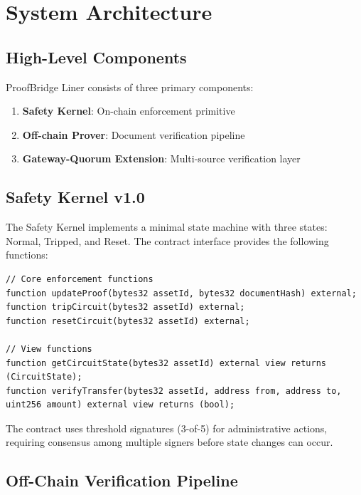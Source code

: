 \documentclass[10pt,conference]{IEEEtran}
\begin{document}
\section{System Architecture}
\label{sec:architecture}

\subsection{High-Level Components}
\label{subsec:high_level}

ProofBridge Liner consists of three primary components:

\begin{enumerate}
\item \textbf{Safety Kernel}: On-chain enforcement primitive
\item \textbf{Off-chain Prover}: Document verification pipeline
\item \textbf{Gateway-Quorum Extension}: Multi-source verification layer
\end{enumerate}

\subsection{Safety Kernel v1.0}
\label{subsec:safety_kernel}

The Safety Kernel implements a minimal state machine with three states: Normal, Tripped, and Reset. The contract interface provides the following functions:

\begin{lstlisting}[language=Solidity,caption=Contract Interface]
// Core enforcement functions
function updateProof(bytes32 assetId, bytes32 documentHash) external;
function tripCircuit(bytes32 assetId) external;
function resetCircuit(bytes32 assetId) external;

// View functions
function getCircuitState(bytes32 assetId) external view returns (CircuitState);
function verifyTransfer(bytes32 assetId, address from, address to, uint256 amount) external view returns (bool);
\end{lstlisting}

The contract uses threshold signatures (3-of-5) for administrative actions, requiring consensus among multiple signers before state changes can occur.

\subsection{Off-Chain Verification Pipeline}
\label{subsec:verification_pipeline}
\end{document}
